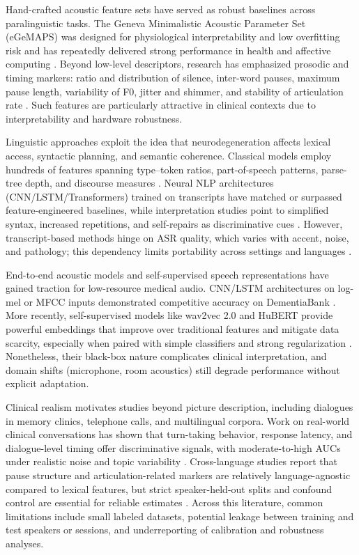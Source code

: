 \documentclass{article}
\begin{document}
Hand-crafted acoustic feature sets have served as robust baselines across paralinguistic tasks. The Geneva Minimalistic Acoustic Parameter Set (eGeMAPS) was designed for physiological interpretability and low overfitting risk and has repeatedly delivered strong performance in health and affective computing \citep{gemaps2015}. Beyond low-level descriptors, research has emphasized prosodic and timing markers: ratio and distribution of silence, inter-word pauses, maximum pause length, variability of F0, jitter and shimmer, and stability of articulation rate \citep{review2020,longitudinal2017}. Such features are particularly attractive in clinical contexts due to interpretability and hardware robustness.

Linguistic approaches exploit the idea that neurodegeneration affects lexical access, syntactic planning, and semantic coherence. Classical models employ hundreds of features spanning type–token ratios, part-of-speech patterns, parse-tree depth, and discourse measures \citep{fraser2016}. Neural NLP architectures (CNN/LSTM/Transformers) trained on transcripts have matched or surpassed feature-engineered baselines, while interpretation studies point to simplified syntax, increased repetitions, and self-repairs as discriminative cues \citep{karlekar2018}. However, transcript-based methods hinge on ASR quality, which varies with accent, noise, and pathology; this dependency limits portability across settings and languages \citep{review2020}.

End-to-end acoustic models and self-supervised speech representations have gained traction for low-resource medical audio. CNN/LSTM architectures on log-mel or MFCC inputs demonstrated competitive accuracy on DementiaBank \citep{warnita2018}. More recently, self-supervised models like wav2vec 2.0 and HuBERT provide powerful embeddings that improve over traditional features and mitigate data scarcity, especially when paired with simple classifiers and strong regularization \citep{ssl_alzheimers,hubert2021}. Nonetheless, their black-box nature complicates clinical interpretation, and domain shifts (microphone, room acoustics) still degrade performance without explicit adaptation.

Clinical realism motivates studies beyond picture description, including dialogues in memory clinics, telephone calls, and multilingual corpora. Work on real-world clinical conversations has shown that turn-taking behavior, response latency, and dialogue-level timing offer discriminative signals, with moderate-to-high AUCs under realistic noise and topic variability \citep{mirheidari2019}. Cross-language studies report that pause structure and articulation-related markers are relatively language-agnostic compared to lexical features, but strict speaker-held-out splits and confound control are essential for reliable estimates \citep{gosztolya2019,review2020}. Across this literature, common limitations include small labeled datasets, potential leakage between training and test speakers or sessions, and underreporting of calibration and robustness analyses.
\end{document}
